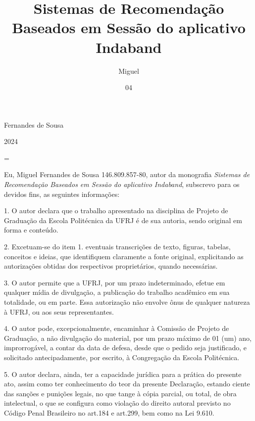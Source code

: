 \documentclass[tcc,numbers]{coppe}
\begin{document}
  \title{Sistemas de Recomendação Baseados em Sessão do aplicativo Indaband}
  \author{Miguel}{Fernandes de Sousa}

  \date{04}{2024}


  \hbadness=\maxdimen
  \maketitle

  \frontmatter

  \makecatalog

  \newpage
  \thispagestyle{fancy}
  \renewcommand{\headrulewidth}{0pt}


Eu, Miguel Fernandes de Sousa 146.809.857-80, autor da monografia
\textit{Sistemas de Recomendação Baseados em Sessão do aplicativo Indaband},
subscrevo para os devidos fins, as seguintes informações: 

1. O autor declara que o trabalho apresentado na disciplina de Projeto de
Graduação da Escola Politécnica da UFRJ é de sua autoria, sendo original em forma
e conteúdo.

2. Excetuam-se do item 1. eventuais transcrições de texto, figuras, tabelas,
conceitos e ideias, que identifiquem claramente a fonte original, explicitando
as autorizações obtidas dos respectivos proprietários, quando necessárias.

3. O autor permite que a UFRJ, por um prazo indeterminado, efetue em qualquer
mídia de divulgação, a publicação do trabalho acadêmico em sua totalidade, ou em
parte. Essa autorização não envolve ônus de qualquer natureza à UFRJ, ou aos seus
representantes.

4. O autor pode, excepcionalmente, encaminhar à Comissão de Projeto de Graduação,
a não divulgação do material, por um prazo máximo de 01 (um) ano, improrrogável,
a contar da data de defesa, desde que o pedido seja justificado, e solicitado
antecipadamente, por escrito, à Congregação da Escola Politécnica.

5. O autor declara, ainda, ter a capacidade jurídica para a prática do presente
ato, assim como ter conhecimento do teor da presente Declaração, estando ciente
das sanções e punições legais, no que tange à cópia parcial, ou total, de obra
intelectual, o que se configura como violação do direito autoral previsto no
Código Penal Brasileiro no art.184 e art.299, bem como na Lei 9.610.
\end{document}
